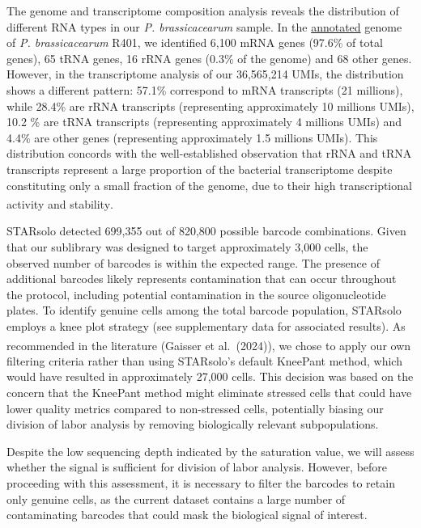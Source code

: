 \documentclass[
  11pt,
  a4paper,
]{report}
\begin{document}
The genome and transcriptome composition analysis reveals the
distribution of different RNA types in our \emph{P. brassicacearum}
sample. In the
\href{https://www.ncbi.nlm.nih.gov/datasets/gene/GCA_030064105.1/}{annotated}
genome of \emph{P. brassicacearum} R401, we identified 6,100 mRNA genes
(97.6\% of total genes), 65 tRNA genes, 16 rRNA genes (0.3\% of the
genome) and 68 other genes. However, in the transcriptome analysis of
our 36,565,214 UMIs, the distribution shows a different pattern: 57.1\%
correspond to mRNA transcripts (21 millions), while 28.4\% are rRNA
transcripts (representing approximately 10 millions UMIs), 10.2 \% are
tRNA transcripts (representing approximately 4 millions UMIs) and 4.4\%
are other genes (representing approximately 1.5 millions UMIs). This
distribution concords with the well-established observation that rRNA
and tRNA transcripts represent a large proportion of the bacterial
transcriptome despite constituting only a small fraction of the genome,
due to their high transcriptional activity and
stability\textsuperscript{}.

STARsolo detected 699,355 out of 820,800 possible barcode combinations.
Given that our sublibrary was designed to target approximately 3,000
cells, the observed number of barcodes is within the expected range. The
presence of additional barcodes likely represents contamination that can
occur throughout the protocol, including potential contamination in the
source oligonucleotide plates. To identify genuine cells among the total
barcode population, STARsolo employs a knee plot strategy (see
supplementary data for associated results). As recommended in the
literature (Gaisser et
al.~(2024)\textsuperscript{}), we chose to
apply our own filtering criteria rather than using STARsolo's default
KneePant method, which would have resulted in approximately 27,000
cells. This decision was based on the concern that the KneePant method
might eliminate stressed cells that could have lower quality metrics
compared to non-stressed cells, potentially biasing our division of
labor analysis by removing biologically relevant subpopulations.

Despite the low sequencing depth indicated by the saturation value, we
will assess whether the signal is sufficient for division of labor
analysis. However, before proceeding with this assessment, it is
necessary to filter the barcodes to retain only genuine cells, as the
current dataset contains a large number of contaminating barcodes that
could mask the biological signal of interest.
\end{document}
